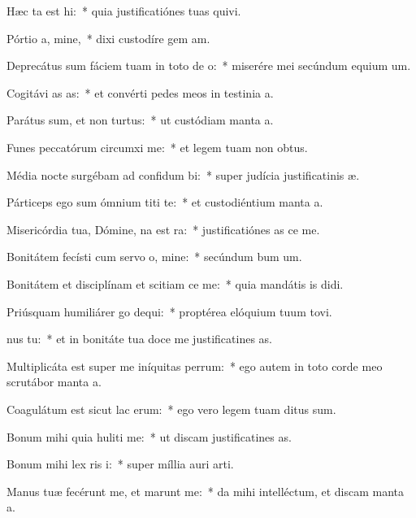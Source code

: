 \item Hæc ta est hi:~* quia justificatiónes tuas quivi.
\item Pórtio a, mine,~* dixi custodíre gem am.
\item Deprecátus sum fáciem tuam in toto de o:~* miserére mei secúndum equium um.
\item Cogitávi as as:~* et convérti pedes meos in testinia a.
\item Parátus sum, et non  turtus:~* ut custódiam manta a.
\item Funes peccatórum circumxi  me:~* et legem tuam non  obtus.
\item Média nocte surgébam ad confidum bi:~* super judícia justificatinis æ.
\item Párticeps ego sum ómnium titi te:~* et custodiéntium manta a.
\item Misericórdia tua, Dómine, na est ra:~* justificatiónes as ce me.
\item Bonitátem fecísti cum servo o, mine:~* secúndum bum um.
\item Bonitátem et disciplínam et scitiam ce me:~* quia mandátis is didi.
\item Priúsquam humiliárer go dequi:~* proptérea elóquium tuum tovi.
\item {}nus  tu:~* et in bonitáte tua doce me justificatines as.
\item Multiplicáta est super me iníquitas perrum:~* ego autem in toto corde meo scrutábor manta a.
\item Coagulátum est sicut lac  erum:~* ego vero legem tuam ditus sum.
\item Bonum mihi quia huliti me:~* ut discam justificatines as.
\item Bonum mihi lex ris i:~* super míllia auri  arti.
\item Manus tuæ fecérunt me, et marunt me:~* da mihi intelléctum, et discam manta a.
